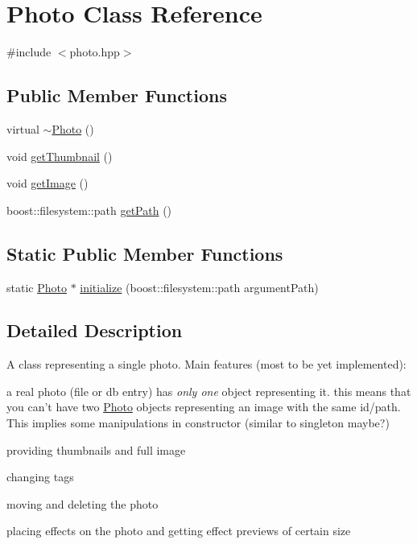 \hypertarget{classPhoto}{\section{Photo Class Reference}
\label{classPhoto}
}


{\ttfamily \#include $<$photo.\-hpp$>$}

\subsection*{Public Member Functions}
\begin{DoxyCompactItemize}
\item 
virtual \hyperlink{classPhoto_a1bf707fc71f95a3aa3464bd4e339afd0}{$\sim$\-Photo} ()
\item 
void \hyperlink{classPhoto_a8e86e62d0ac46bf94e16391a373a4abc}{get\-Thumbnail} ()
\item 
void \hyperlink{classPhoto_a9796448b191e7696f9024a86fa4d02c9}{get\-Image} ()
\item 
boost\-::filesystem\-::path \hyperlink{classPhoto_ab369ad720923dda4db65996cd2844859}{get\-Path} ()
\end{DoxyCompactItemize}
\subsection*{Static Public Member Functions}
\begin{DoxyCompactItemize}
\item 
static \hyperlink{classPhoto}{Photo} $\ast$ \hyperlink{classPhoto_a0ed71e4b83a3e12c3d0c0048b1de767f}{initialize} (boost\-::filesystem\-::path argument\-Path)
\end{DoxyCompactItemize}


\subsection{Detailed Description}
A class representing a single photo. Main features (most to be yet implemented)\-:
\begin{DoxyItemize}
\item a real photo (file or db entry) has {\itshape only one\/} object representing it. this means that you can't have two \hyperlink{classPhoto}{Photo} objects representing an image with the same id/path. This implies some manipulations in constructor (similar to singleton maybe?)
\item providing thumbnails and full image
\item changing tags
\item moving and deleting the photo
\item placing effects on the photo and getting effect previews of certain size 
\end{DoxyItemize}

